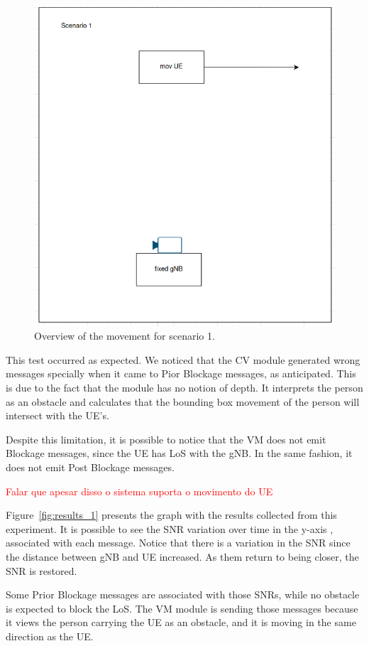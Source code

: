 \begin{figure}[H]
    \centering
    \includegraphics[width=0.5\linewidth]{figures/scenario1}
    \caption{Overview of the movement for scenario 1.}
    \label{fig:test_movUE}
\end{figure}

This test occurred as expected.
We noticed that the CV module generated wrong messages specially when it came to Pior Blockage messages, as anticipated.
This is due to the fact that the module has no notion of depth.
It interprets the person as an obstacle and calculates that the bounding box movement of the person will intersect with the UE's.

Despite this limitation, it is possible to notice that the VM does not emit Blockage messages, since the UE has LoS with the gNB\@.
In the same fashion, it does not emit Post Blockage messages.

\textcolor{red}{Falar que apesar disso o sistema suporta o movimento do UE}

Figure~\ref{fig:results_1} presents the graph with the results collected from this experiment.
It is possible to see the SNR variation over time in the y-axis , associated with each message.
Notice that there is a variation in the SNR since the distance between gNB and UE increased.
As them return to being closer, the SNR is restored.

Some Prior Blockage messages are associated with those SNRs, while no obstacle is expected to block the LoS\@.
The VM module is sending those messages because it views the person carrying the UE as an obstacle, and it is moving in the same direction as the UE\@.


